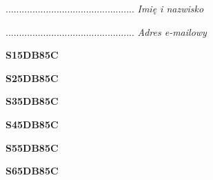 \begin{turn}{90}\begin{minipage}{\linewidth} \vspace{20mm} ................................................  \textit{Imię i nazwisko}\end{minipage}\end{turn}

\begin{turn}{90}\begin{minipage}{\linewidth} \vspace{20mm} ................................................  \textit{Adres e-mailowy}\end{minipage}\end{turn}

\begin{turn}{90}\huge \begin{minipage}{\linewidth} \vspace{10mm}\textbf{S15DB85C}\end{minipage}\end{turn}

\begin{turn}{90}\huge \begin{minipage}{\linewidth} \vspace{10mm}\textbf{S25DB85C}\end{minipage}\end{turn}

\begin{turn}{90}\huge \begin{minipage}{\linewidth} \vspace{10mm}\textbf{S35DB85C}\end{minipage}\end{turn}

\begin{turn}{90}\huge \begin{minipage}{\linewidth} \vspace{10mm}\textbf{S45DB85C}\end{minipage}\end{turn}

\begin{turn}{90}\huge \begin{minipage}{\linewidth} \vspace{10mm}\textbf{S55DB85C}\end{minipage}\end{turn}

\begin{turn}{90}\huge \begin{minipage}{\linewidth} \vspace{10mm}\textbf{S65DB85C}\end{minipage}\end{turn}

